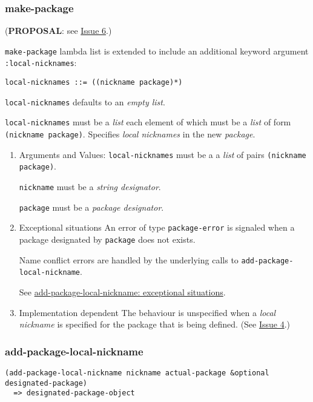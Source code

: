 \documentclass[11pt]{article}
\begin{document}
\subsubsection{make-package}
\label{sec:orgd9ef999}
(\textbf{PROPOSAL}: see \hyperref[sec:org28d6b88]{Issue 6}.)

\texttt{make-package} lambda list is extended to include an additional keyword argument
\texttt{:local-nicknames}:
\begin{verbatim}
local-nicknames ::= ((nickname package)*)
\end{verbatim}


\texttt{local-nicknames} defaults to an \emph{empty list}.

\texttt{local-nicknames} must be a \emph{list} each element of which must be a \emph{list} of form
\texttt{(nickname package)}. Specifies \emph{local nicknames} in the new \emph{package}.
\begin{enumerate}
\item Arguments and Values:
\label{sec:org0914f7d}
\texttt{local-nicknames} must be a a \emph{list} of pairs \texttt{(nickname package)}.

\texttt{nickname} must be a \emph{string designator}.

\texttt{package} must be a \emph{package designator}.
\item Exceptional situations
\label{sec:org1f5ffe3}
An error of type \texttt{package-error} is signaled when a package designated by
\texttt{package} does not exists.

Name conflict errors are handled by the underlying calls to
\texttt{add-package-local-nickname}.

See \hyperref[sec:org07f12c7]{add-package-local-nickname: exceptional situations}.
\item Implementation dependent
\label{sec:org660f9c3}
The behaviour is unspecified when a \emph{local nickname} is specified for the package
that is being defined. (See \hyperref[sec:orga574aea]{Issue 4}.)
\end{enumerate}
\subsubsection{add-package-local-nickname}
\label{sec:org1dcc074}
\begin{verbatim}
(add-package-local-nickname nickname actual-package &optional designated-package)
  => designated-package-object
\end{verbatim}
\end{document}
